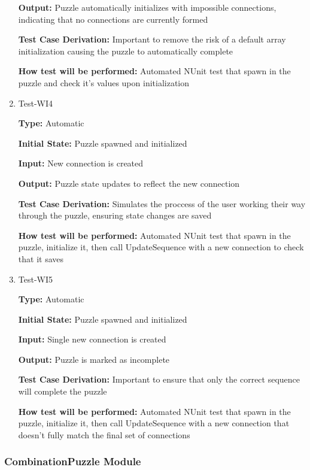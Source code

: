 \documentclass[12pt, titlepage]{article}
\begin{document}
\begin{enumerate}
 \textbf{Output:} Puzzle automatically initializes with impossible connections, indicating that no connections are currently formed

 \textbf{Test Case Derivation:} Important to remove the risk of a default array initialization causing the puzzle to automatically complete

 \textbf{How test will be performed:} Automated NUnit test that spawn in the puzzle and check it's values upon initialization

  \item{Test-WI4\\}

 \textbf{Type:} Automatic
					
 \textbf{Initial State:} Puzzle spawned and initialized
					
 \textbf{Input:} New connection is created
					
 \textbf{Output:} Puzzle state updates to reflect the new connection

 \textbf{Test Case Derivation:} Simulates the proccess of the user working their way through the puzzle, ensuring state changes are saved

 \textbf{How test will be performed:} Automated NUnit test that spawn in the puzzle, initialize it, then call UpdateSequence with a new connection to check that it saves

 \item{Test-WI5\\}

 \textbf{Type:} Automatic
					
 \textbf{Initial State:} Puzzle spawned and initialized
					
 \textbf{Input:} Single new connection is created
					
 \textbf{Output:} Puzzle is marked as incomplete

 \textbf{Test Case Derivation:} Important to ensure that only the correct sequence will complete the puzzle

 \textbf{How test will be performed:} Automated NUnit test that spawn in the puzzle, initialize it, then call UpdateSequence with a new connection that doesn't fully match the final set of connections
 
 \end{enumerate}

 \subsubsection{CombinationPuzzle Module}
 
\end{document}
